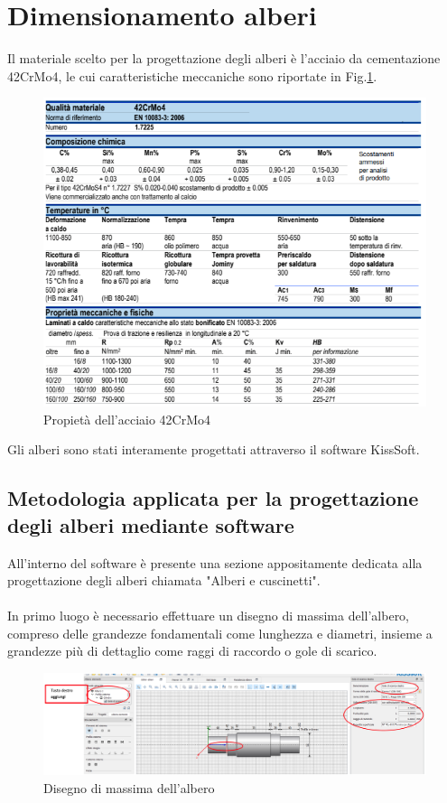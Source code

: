 \section{Dimensionamento alberi}
Il materiale scelto per la progettazione degli alberi è l'acciaio da cementazione 42CrMo4, le cui caratteristiche meccaniche sono riportate in Fig.\ref{fig:MaterialeAlberi}.
\begin{figure}[h]
    \centering
    \includegraphics{Immagini/MaterialeAlberi.png}
    \caption{Propietà dell'acciaio 42CrMo4}
    \label{fig:MaterialeAlberi}
\end{figure}

Gli alberi sono stati interamente progettati attraverso il software KissSoft.
\newpage
\subsection{Metodologia applicata per la progettazione degli alberi mediante software}
All'interno del software è presente una sezione appositamente dedicata alla progettazione degli alberi chiamata "Alberi e cuscinetti".\\
\\
In primo luogo è necessario effettuare un disegno di massima dell'albero, compreso delle grandezze fondamentali come lunghezza e diametri, insieme a grandezze più di dettaglio come raggi di raccordo o gole di scarico. 
\begin{figure}[h]
    \centering
    \includegraphics[scale=0.29]{Immagini/MetodologiaAlberi.png}
    \caption{Disegno di massima dell'albero}
    \label{fig:MetodologiaAlberi}
\end{figure}

